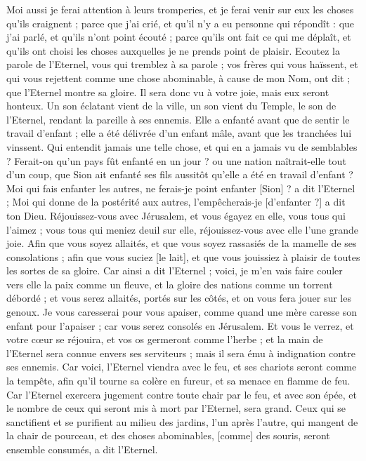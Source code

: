 \begin{multicols}{2}
Moi aussi je ferai attention à leurs tromperies, et je ferai venir sur eux les choses qu'ils craignent ; parce que j'ai crié, et qu'il n'y a eu personne qui répondît : que j'ai parlé, et qu'ils n'ont point écouté ; parce qu'ils ont fait ce qui me déplaît, et qu'ils ont choisi les choses auxquelles je ne prends point de plaisir.
Ecoutez la parole de l'Eternel, vous qui tremblez à sa parole ; vos frères qui vous haïssent, et qui vous rejettent comme une chose abominable, à cause de mon Nom, ont dit ; que l'Eternel montre sa gloire. Il sera donc vu à votre joie, mais eux seront honteux.
Un son éclatant vient de la ville, un son vient du Temple, le son de l'Eternel, rendant la pareille à ses ennemis.
Elle a enfanté avant que de sentir le travail d'enfant ; elle a été délivrée d'un enfant mâle, avant que les tranchées lui vinssent.
Qui entendit jamais une telle chose, et qui en a jamais vu de semblables ? Ferait-on qu'un pays fût enfanté en un jour ? ou une nation naîtrait-elle tout d'un coup, que Sion ait enfanté ses fils aussitôt qu'elle a été en travail d'enfant ?
Moi qui fais enfanter les autres, ne ferais-je point enfanter [Sion] ? a dit l'Eternel ; Moi qui donne de la postérité aux autres, l'empêcherais-je [d'enfanter ?] a dit ton Dieu.
Réjouissez-vous avec Jérusalem, et vous égayez en elle, vous tous qui l'aimez ; vous tous qui meniez deuil sur elle, réjouissez-vous avec elle l'une grande joie.
Afin que vous soyez allaités, et que vous soyez rassasiés de la mamelle de ses consolations ; afin que vous suciez [le lait], et que vous jouissiez à plaisir de toutes les sortes de sa gloire.
Car ainsi a dit l'Eternel ; voici, je m'en vais faire couler vers elle la paix comme un fleuve, et la gloire des nations comme un torrent débordé ; et vous serez allaités, portés sur les côtés, et on vous fera jouer sur les genoux.
Je vous caresserai pour vous apaiser, comme quand une mère caresse son enfant pour l'apaiser ; car vous serez consolés en Jérusalem.
Et vous le verrez, et votre cœur se réjouira, et vos os germeront comme l'herbe ; et la main de l'Eternel sera connue envers ses serviteurs ; mais il sera ému à indignation contre ses ennemis.
Car voici, l'Eternel viendra avec le feu, et ses chariots seront comme la tempête, afin qu'il tourne sa colère en fureur, et sa menace en flamme de feu.
Car l'Eternel exercera jugement contre toute chair par le feu, et avec son épée, et le nombre de ceux qui seront mis à mort par l'Eternel, sera grand.
Ceux qui se sanctifient et se purifient au milieu des jardins, l'un après l'autre, qui mangent de la chair de pourceau, et des choses abominables, [comme] des souris, seront ensemble consumés, a dit l'Eternel.

\end{multicols}
